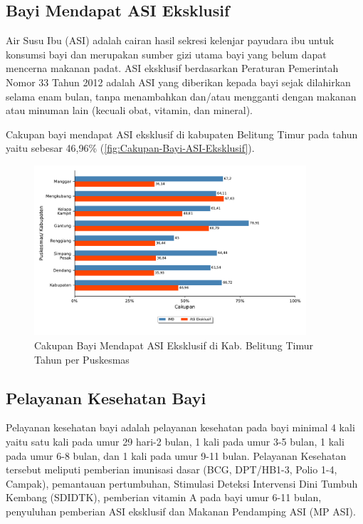 \subsection{Bayi Mendapat ASI Eksklusif}
Air Susu Ibu (ASI) adalah cairan hasil sekresi kelenjar payudara ibu
untuk konsumsi bayi dan merupakan sumber gizi utama bayi yang belum
dapat mencerna makanan padat. ASI eksklusif berdasarkan Peraturan
Pemerintah Nomor 33 Tahun 2012 adalah ASI yang diberikan kepada bayi
sejak dilahirkan selama enam bulan, tanpa menambahkan dan/atau mengganti
dengan makanan atau minuman lain (kecuali obat, vitamin, dan mineral).

Cakupan bayi mendapat ASI eksklusif di kabupaten Belitung Timur pada
tahun \tP yaitu sebesar 46,96\% (\autoref{fig:Cakupan-Bayi-ASI-Eksklusif}).

\begin{figure}[H]
  \centering
  \includegraphics[width=0.9\textwidth]{bab_05/bab_05_15_ASIeksklusif}
  \caption{Cakupan Bayi Mendapat ASI Eksklusif di Kab. Belitung Timur Tahun \tP per Puskesmas}
  \label{fig:Cakupan-Bayi-ASI-Eksklusif}
\end{figure}

\subsection{Pelayanan Kesehatan Bayi}
Pelayanan kesehatan bayi adalah pelayanan kesehatan pada bayi minimal
4 kali yaitu satu kali pada umur 29 hari-2 bulan, 1 kali pada umur
3-5 bulan, 1 kali pada umur 6-8 bulan, dan 1 kali pada umur 9-11 bulan.
Pelayanan Kesehatan tersebut meliputi pemberian imunisasi dasar (BCG,
DPT/HB1-3, Polio 1-4, Campak), pemantauan pertumbuhan, Stimulasi Deteksi
Intervensi Dini Tumbuh Kembang (SDIDTK), pemberian vitamin A pada
bayi umur 6-11 bulan, penyuluhan pemberian ASI eksklusif dan Makanan
Pendamping ASI (MP ASI).

